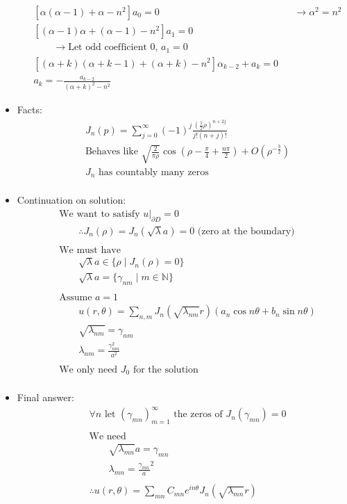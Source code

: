 \documentclass[12pt, a4paper]{article}
\begin{document}
\begin{itemize}
\begin{align*}
        &[\alpha(\alpha -1)+\alpha - n^2]a_0 = 0&&\rightarrow \alpha^2 = n^2\\
        &[(\alpha - 1)\alpha + (\alpha-1)-n^2]a_1 = 0 \\
        &\qquad\rightarrow\text{Let odd coefficient 0, }a_1 = 0\\
        &[(\alpha + k)(\alpha +k-1)+(\alpha+k)-n^2]\alpha_{k-2}+a_k = 0\\
        &a_k = -\frac{a_{k-2}}{(\alpha+k)^2-n^2}
    \end{align*}
    \item Facts:
    \begin{align*}
        &J_n(p)=\sum_{j=0}^\infty(-1)^j\frac{\left(\frac{1}{2}\rho\right)^{n+2j}}{j!(n+j)!}\\
        &\text{Behaves like }\sqrt{\frac{2}{\pi\rho}}\cos(\rho - \frac{\pi}{4}+\frac{n\pi}{2}) + O(\rho^{-\frac{3}{2}})\\
        &J_n \text{ has countably many zeros}\\
    \end{align*}
    \item Continuation on solution:
    \begin{align*}
        &\text{We want to satisfy } \left.u\right\rvert_{\partial D} = 0\\
        &\qquad\therefore J_n(\rho) = J_n(\sqrt{\lambda}a) = 0 \text{ (zero at the boundary)}\\\\
        &\text{We must have}\\
        &\qquad\sqrt{\lambda}a\in \{\rho\;|\;J_n(\rho)=0\}\\
        &\qquad\sqrt{\lambda}a= \{\gamma_{nm}\;|\;m\in\mathbb{N}\}\\\\
        &\text{Assume }a=1\\
        &\qquad u(r, \theta)=\sum_{n, m}J_n(\sqrt{\lambda_{nm}}r)(a_n\cos n\theta + b_n \sin n \theta)\\
        &\qquad\sqrt{\lambda_{nm}} = \gamma_{nm}\\
        &\qquad\lambda_{nm} = \frac{\gamma^2_{nm}}{a^2}\\\\
        &\text{We only need $J_0$ for the solution}\\
    \end{align*}
    \item Final answer:
    \begin{align*}
        &\forall n \text{ let } (\gamma_{mn})^\infty_{m=1} \text{ the zeros of }J_n(\gamma_{mn}) = 0\\\\
        &\text{We need}\\
        &\qquad \sqrt{\lambda_{mn}}a = \gamma_{mn}\\
        &\qquad \lambda_{mn} = \frac{\gamma_{mn}}{a}^2\\\\
        &\therefore u(r, \theta) = \sum_{mn}C_{mn}e^{in\theta}J_n(\sqrt{\lambda_{mn}}r)
    \end{align*}
    
\end{itemize}
\end{document}
